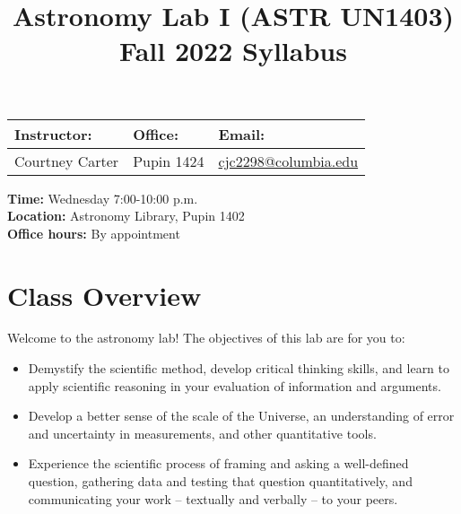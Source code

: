 \documentclass[11pt]{article}
\title{Astronomy Lab I (ASTR UN1403)\\ \medskip \Large{Fall 2022 Syllabus}}
\author{}
\date{}
\begin{document}
\maketitle
\begin{tabularx}{0.9\textwidth} { 
   >{\raggedright\arraybackslash}X 
   >{\raggedright\arraybackslash}X 
   >{\raggedright\arraybackslash}X  }
 \textbf{Instructor:} & \textbf{Office:} & \textbf{Email:} \\ 
 \hline
Courtney Carter & Pupin 1424 & \url{cjc2298@columbia.edu} \\  
\end{tabularx} 

\bigskip
\bigskip

 
 
\noindent \textbf{\normalsize Time:} {\normalsize Wednesday 7:00-10:00 p.m.} \\
\noindent \textbf{\normalsize Location:} {\normalsize Astronomy Library, Pupin 1402} \\
\textbf{\normalsize Office hours:} {\normalsize By appointment} \\
 
 
\section*{Class Overview}
 
Welcome to the astronomy lab! The objectives of this lab are for you to:
\begin{itemize}
\item Demystify the scientific method, develop critical thinking skills, and learn to apply scientific reasoning in your evaluation of information and arguments. 
\item Develop a better sense of the scale of the Universe, an understanding of error and uncertainty in measurements, and other quantitative tools. %
\item Experience the scientific process of framing and asking a well-defined question, gathering data and testing that question quantitatively, and communicating your work -- textually and verbally -- to your peers.
\end{itemize}
\end{document}
